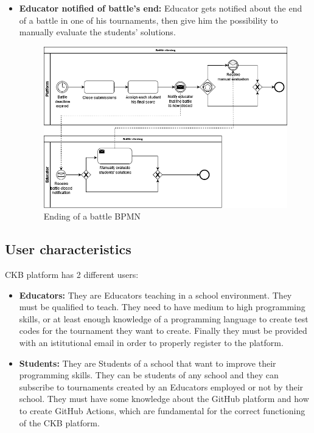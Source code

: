 \documentclass{article}
\begin{document}
{\begin{itemize}
    \item \textbf{Educator notified of battle's end:} Educator gets notified about the end of a battle in one of his tournaments, 
    then give him the possibility to manually evaluate the students' solutions.
          \begin{figure}[H]
              \centering
              \includegraphics[scale=0.35]{images/BPMN/BPMN12.png}
              \caption{Ending of a battle BPMN}
              \label{fig:battleEndingBPMN}
          \end{figure}
\end{itemize}

\subsection{User characteristics}
CKB platform has 2 different users:
\begin{itemize}
    \item \textbf{Educators:} They are Educators teaching in a school
          environment. They must be qualified to teach. They need to have
          medium to high programming skills, or at least enough knowledge of a programming language
          to create test codes for the tournament they want to create.
          Finally they must be provided with an istitutional email in order to properly
          register to the platform.
    \item \textbf{Students:} They are Students of a school that want to
          improve their programming skills. They can be students of any school and they
          can subscribe to tournaments created by an Educators
          employed or not by their school. They must have some knowledge about the GitHub
          platform and how to create GitHub Actions, which are fundamental for the correct
          functioning of the CKB platform.
\end{itemize}

}
\end{document}
